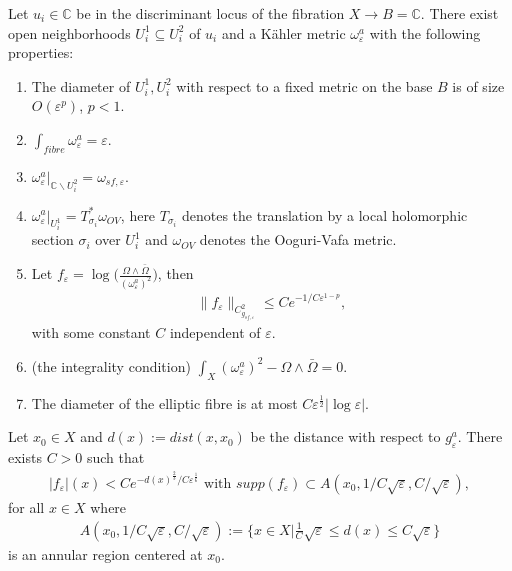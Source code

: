 \documentclass[10pt,a4paper]{amsart}
\renewcommand{\epsilon}{\varepsilon}
\renewcommand{\leq}{\leqslant}
\renewcommand{\le}{\leqslant}
\begin{document}
\begin{lem}\label{ansatz metric} 
	Let $u_i\in \mathbb{C}$ be in the discriminant locus of the fibration ${X}\rightarrow B=\mathbb{C}$. There exist open neighborhoods $U_i^1\subseteq U_i^2$ of $u_i$ and a K\"ahler metric $\omega^a_{\epsilon}$ with the following properties:
	\begin{enumerate}
		\item The diameter of $U_i^1, U_i^2$ with respect to a fixed metric on the base $B$ is of size $O(\epsilon^p)$, $p<1$.  
		\item $\int_{fibre} \omega^a_{\epsilon}=\epsilon$.
		\item ${\omega}^a_{\epsilon}|_{\mathbb{C}\backslash U^2_i}={\omega}_{sf,\epsilon}$.
		\item ${\omega}^a_{\epsilon}|_{U^1_i}=T_{\sigma_i}^*\omega_{OV}$, here $T_{\sigma_i}$ denotes the translation by a local holomorphic section $\sigma_i$ over $U^{1}_i$ and $\omega_{OV}$ denotes the Ooguri-Vafa metric. 
		\item Let $f_{\epsilon}=\log{\bigg( \frac{\Omega\wedge \bar{\Omega}}{({\omega}^a_{\epsilon})^2}\bigg)}$, then 
		\begin{align*}
			\|f_{\epsilon} \|_{C^2_{g_{sf,\epsilon}}}\le Ce^{-1/C\epsilon^{1-p}},
		\end{align*} with some constant $C$ independent of $\epsilon$. 
	   \item (the integrality condition) $\int_{X} (\omega^a_{\epsilon})^2-\Omega\wedge \bar{\Omega}=0$.
	   \item The diameter of the elliptic fibre is at most $C\epsilon^{\frac{1}{2}}|\log{\epsilon}|$.  
	\end{enumerate}
\end{lem}

\begin{cor}\label{est_of_f} Let $x_0\in X$ and $d(x):=dist(x,x_0)$ be the distance with respect to $g^a_{\varepsilon}$. There exists $C>0$ such that
\begin{align}
|f_{\varepsilon}|(x)<Ce^{-d(x)^{\frac{2}{3}}/C\varepsilon^{\frac{1}{6}}}\mbox{ with }supp(f_{\varepsilon})\subset A( x_0,1/C\sqrt{\varepsilon}, C/\sqrt{\varepsilon}),
\end{align}
for all $x\in X$ where
\begin{align*}
A( x_0,1/C\sqrt{\varepsilon}, C/\sqrt{\varepsilon}):=\Big\{x\in X\Big|\frac{1}{C}\sqrt{\varepsilon} \leq d(x)\leq C\sqrt{\varepsilon} \Big\}
\end{align*}
is an annular region centered at $x_0$.
\end{cor}
\end{document}
